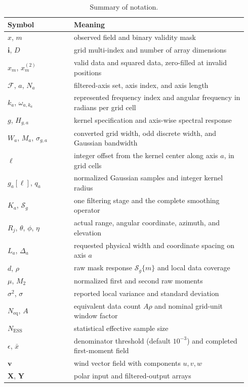 \documentclass[a4paper,fleqn]{cas-sc}
\newcommand{\vect}[1]{\boldsymbol{#1}}  %
\newcommand{\mat}[1]{\mathbf{#1}}       %
\begin{document}
\begin{table}[htbp]
	\centering
	\caption{Summary of notation.}
	\label{tab:notation}
	\begin{tabular}{@{}p{0.26\linewidth}p{0.68\linewidth}@{}}
		\toprule
		Symbol                   & Meaning                                                    \\
		\midrule
		$x$, $m$ & observed field and binary validity mask \\
		$\mathbf{i}$, $D$ & grid multi-index and number of array dimensions \\
		$x_m$, $x_m^{(2)}$ & valid data and squared data, zero-filled at invalid positions \\
		$\mathcal{F}$, $a$, $N_a$ & filtered-axis set, axis index, and axis length \\
		$k_a$, $\omega_{a,k_a}$ & represented frequency index and angular frequency in radians per grid cell \\
		$g$, $H_{g,a}$ & kernel specification and axis-wise spectral response \\
		$W_a$, $M_a$, $\sigma_{g,a}$ & converted grid width, odd discrete width, and Gaussian bandwidth \\
		$\ell$ & integer offset from the kernel center along axis $a$, in grid cells \\
		$g_a[\ell]$, $q_a$ & normalized Gaussian samples and integer kernel radius \\
		$K_a$, $\mathcal{S}_g$ & one filtering stage and the complete smoothing operator \\
		$R_j$, $\theta$, $\phi$, $\eta$ & actual range, angular coordinate, azimuth, and elevation \\
		$L_a$, $\Delta_a$ & requested physical width and coordinate spacing on axis $a$ \\
		$d$, $\rho$ & raw mask response $\mathcal{S}_g\{m\}$ and local data coverage \\
		$\mu$, $M_2$ & normalized first and second raw moments \\
		$\sigma^2$, $\sigma$ & reported local variance and standard deviation \\
		$N_{\mathrm{eq}}$, $A$ & equivalent data count $A\rho$ and nominal grid-unit window factor \\
		$N_{\mathrm{ESS}}$ & statistical effective sample size \\
		$\epsilon$, $\bar{x}$ & denominator threshold (default $10^{-3}$) and completed first-moment field \\
		$\vect{v}$ & wind vector field with components $u,v,w$ \\
		$\mat{X}$, $\mat{Y}$ & polar input and filtered-output arrays \\
		\bottomrule
	\end{tabular}
\end{table}
\end{document}
